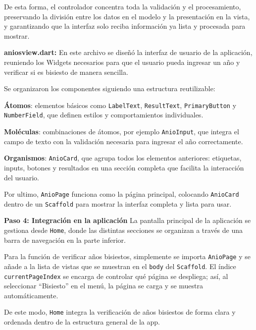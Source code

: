 De esta forma, el controlador concentra toda la validación y el procesamiento, preservando la división entre los datos en el modelo y la presentación en la vista, y garantizando que la interfaz solo reciba información ya lista y procesada para mostrar.

\textbf{aniosview.dart:}  
En este archivo se diseñó la interfaz de usuario de la aplicación, reuniendo los Widgets necesarios para que el usuario pueda ingresar un año y verificar si es bisiesto de manera sencilla.

Se organizaron los componentes siguiendo una estructura reutilizable:

\textbf{Átomos}: elementos básicos como \texttt{LabelText}, \texttt{ResultText}, \texttt{PrimaryButton} y \texttt{NumberField}, que definen estilos y comportamientos individuales.

\textbf{Moléculas}: combinaciones de átomos, por ejemplo \texttt{AnioInput}, que integra el campo de texto con la validación necesaria para ingresar el año correctamente.

\textbf{Organismos}: \texttt{AnioCard}, que agrupa todos los elementos anteriores: etiquetas, inputs, botones y resultados en una sección completa que facilita la interacción del usuario.

Por ultimo, \texttt{AnioPage} funciona como la página principal, colocando \texttt{AnioCard} dentro de un \texttt{Scaffold} para mostrar la interfaz completa y lista para usar.

\textbf{Paso 4: Integración en la aplicación}  
La pantalla principal de la aplicación se gestiona desde \texttt{Home}, donde las distintas secciones se organizan a través de una barra de navegación en la parte inferior.

Para la función de verificar años bisiestos, simplemente se importa \texttt{AnioPage} y se añade a la lista de vistas que se muestran en el \texttt{body} del \texttt{Scaffold}. El índice \texttt{currentPageIndex} se encarga de controlar qué página se despliega; así, al seleccionar “Bisiesto” en el menú, la página se carga y se muestra automáticamente.

De este modo, \texttt{Home} integra la verificación de años bisiestos de forma clara y ordenada dentro de la estructura general de la app.
